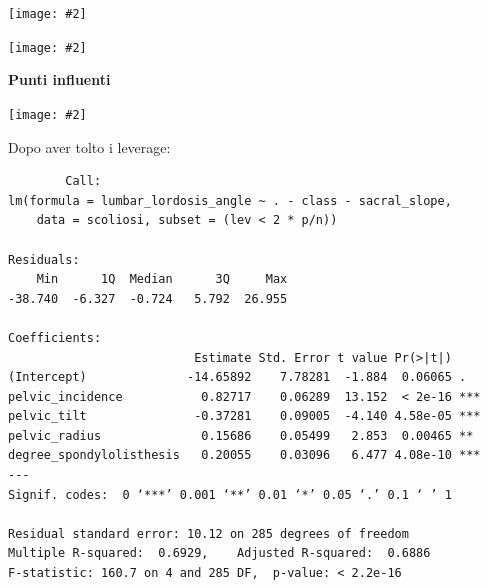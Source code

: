 \documentclass{beamer}
\newcommand{\fg}[2]{%
  \begin{center}
      \texttt{[image: \#2]}%
  \end{center}
}
\begin{document}
\begin{frame}
	\fg{0.6}{04residuistudentizzati}
\end{frame}


\begin{frame}
	\fg{0.6}{05graficone}
\end{frame}




\begin{frame}
	\textbf{Punti influenti}
	\fg{0.6}{06influencialPlot}
\end{frame}



\begin{frame}[fragile]
	Dopo aver tolto i leverage:

	{\tiny
	\begin{verbatim}
		Call:
lm(formula = lumbar_lordosis_angle ~ . - class - sacral_slope, 
    data = scoliosi, subset = (lev < 2 * p/n))

Residuals:
    Min      1Q  Median      3Q     Max 
-38.740  -6.327  -0.724   5.792  26.955 

Coefficients:
                          Estimate Std. Error t value Pr(>|t|)    
(Intercept)              -14.65892    7.78281  -1.884  0.06065 .  
pelvic_incidence           0.82717    0.06289  13.152  < 2e-16 ***
pelvic_tilt               -0.37281    0.09005  -4.140 4.58e-05 ***
pelvic_radius              0.15686    0.05499   2.853  0.00465 ** 
degree_spondylolisthesis   0.20055    0.03096   6.477 4.08e-10 ***
---
Signif. codes:  0 ‘***’ 0.001 ‘**’ 0.01 ‘*’ 0.05 ‘.’ 0.1 ‘ ’ 1

Residual standard error: 10.12 on 285 degrees of freedom
Multiple R-squared:  0.6929,	Adjusted R-squared:  0.6886 
F-statistic: 160.7 on 4 and 285 DF,  p-value: < 2.2e-16
	\end{verbatim}
	}
\end{frame}
\end{document}
